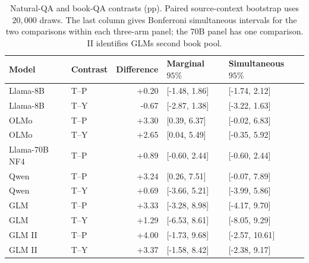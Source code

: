 \begin{table}[ht]
\centering\small
\caption{Natural-QA and book-QA contrasts (pp). Paired source-context bootstrap uses $20{,}000$ draws. The last column gives Bonferroni simultaneous intervals for the two comparisons within each three-arm panel; the 70B panel has one comparison. II identifies GLM\textquotesingle s second book pool.}
\label{tab:infinite-qa-intervals}
\begin{tabular}{@{}llrll@{}}
\toprule
Model & Contrast & Difference & Marginal $95\%$ & Simultaneous $95\%$ \\
\midrule
Llama-8B & T--P & +0.20 & [-1.48, 1.86] & [-1.74, 2.12] \\
Llama-8B & T--Y & -0.67 & [-2.87, 1.38] & [-3.22, 1.63] \\
OLMo & T--P & +3.30 & [0.39, 6.37] & [-0.02, 6.83] \\
OLMo & T--Y & +2.65 & [0.04, 5.49] & [-0.35, 5.92] \\
Llama-70B NF4 & T--P & +0.89 & [-0.60, 2.44] & [-0.60, 2.44] \\
Qwen & T--P & +3.24 & [0.26, 7.51] & [-0.07, 7.89] \\
Qwen & T--Y & +0.69 & [-3.66, 5.21] & [-3.99, 5.86] \\
GLM & T--P & +3.33 & [-3.28, 8.98] & [-4.17, 9.70] \\
GLM & T--Y & +1.29 & [-6.53, 8.61] & [-8.05, 9.29] \\
GLM II & T--P & +4.00 & [-1.73, 9.68] & [-2.57, 10.61] \\
GLM II & T--Y & +3.37 & [-1.58, 8.42] & [-2.38, 9.17] \\
\bottomrule
\end{tabular}
\end{table}
